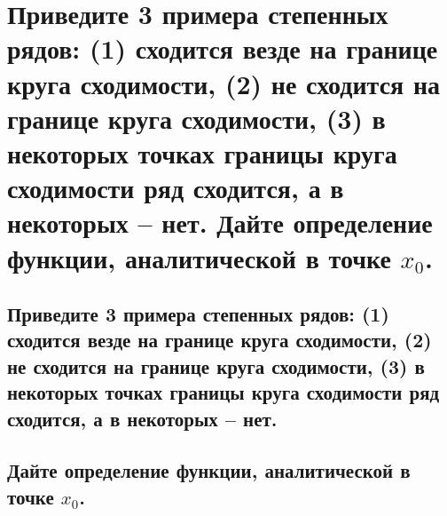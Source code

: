 \section{Приведите 3 примера степенных рядов: (1) сходится везде на границе круга сходимости, (2) не сходится на границе круга сходимости, (3) в некоторых точках границы круга сходимости ряд сходится, а в некоторых -- нет. Дайте определение функции, аналитической в точке $x_0$.}

\subsection{Приведите 3 примера степенных рядов: (1) сходится везде на границе круга сходимости, (2) не сходится на границе круга сходимости, (3) в некоторых точках границы круга сходимости ряд сходится, а в некоторых -- нет.}

\subsection{Дайте определение функции, аналитической в точке $x_0$.}